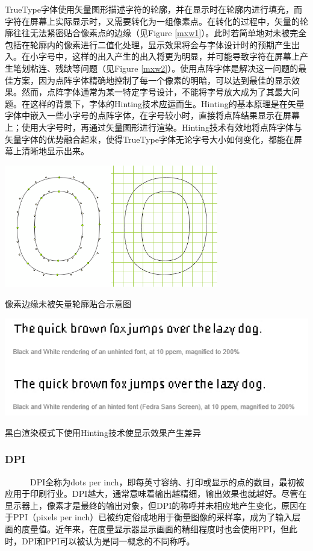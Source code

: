 \documentclass[a4paper]{article}
\begin{document}
TrueType字体使用矢量图形描述字符的轮廓，并在显示时在轮廓内进行填充，而字符在屏幕上实际显示时，又需要转化为一组像素点。在转化的过程中，矢量的轮廓往往无法紧密贴合像素点的边缘（见Figure \ref{mxw1}）。此时若简单地对未被完全包括在轮廓内的像素进行二值化处理，显示效果将会与字体设计时的预期产生出入。在小字号中，这样的出入产生的出入将更为明显，并可能导致字符在屏幕上产生笔划粘连、残缺等问题（见Figure \ref{mxw2}）。使用点阵字体是解决这一问题的最佳方案，因为点阵字体精确地控制了每一个像素的明暗，可以达到最佳的显示效果。然而，点阵字体通常为某一特定字号设计，不能将字号放大成为了其最大问题。在这样的背景下，字体的Hinting技术应运而生。Hinting的基本原理是在矢量字体中嵌入一些小字号的点阵字体，在字号较小时，直接将点阵结果显示在屏幕上；使用大字号时，再通过矢量图形进行渲染。Hinting技术有效地将点阵字体与矢量字体的优势融合起来，使得TrueType字体无论字号大小如何变化，都能在屏幕上清晰地显示出来。

\makeatletter
\def\@captype{figure}
\makeatother
\centerline{\includegraphics [width=0.7\textwidth]{mxw1.png} }
\caption{像素边缘未被矢量轮廓贴合示意图\cite{mxw2}}
\label{mxw1}

\makeatletter
\def\@captype{figure}
\makeatother
\centerline{\includegraphics [width=1\textwidth]{mxw2.png} }
\caption{黑白渲染模式下使用Hinting技术使显示效果产生差异}
\label{mxw2}



\subsubsection{DPI}
~~~~~~DPI全称为dots per inch，即每英寸容纳、打印或显示的点的数目，最初被应用于印刷行业。DPI越大，通常意味着输出越精细，输出效果也就越好。尽管在显示器上，像素才是最终的输出对象，但DPI的称呼并未相应地产生变化，原因在于PPI（pixels per inch）已被约定俗成地用于衡量图像的采样率，成为了输入层面的度量值。近年来，在度量显示器显示画面的精细程度时也会使用PPI，但此时，DPI和PPI可以被认为是同一概念的不同称呼。
\end{document}
